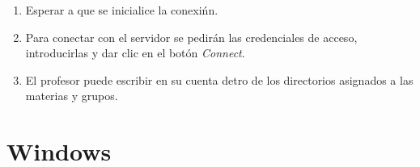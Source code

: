{\begin{enumerate}
    \texttt{https://xnas.tonejito.org/profesor/}


  \item Esperar a que se inicialice la conexi\'{n}n.


  \item Para conectar con el servidor se pedir\'{a}n las credenciales de acceso, introducirlas y dar clic en el bot\'{o}n \textsl{Connect}.


  \item El profesor puede escribir en su cuenta detro de los directorios asignados a las materias y grupos.

\end{enumerate}
}

    \section {Windows}

%


